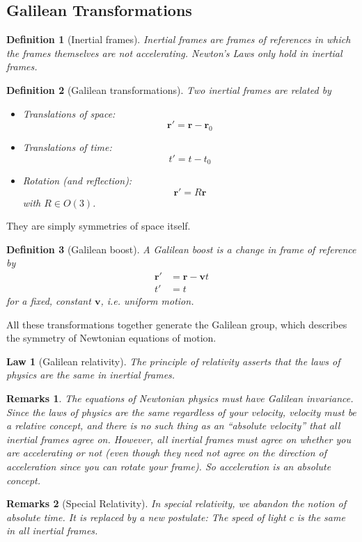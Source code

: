 \documentclass[a4paper]{article}
\newtheorem{remarks}{Remarks}[section]
\theoremstyle{new}
\newtheorem{law}{Law}[section]
\newtheorem{defi}{Definition}[section]
\begin{document}
\subsection{Galilean Transformations}
\begin{defi}[Inertial frames]
  Inertial frames are frames of references in which the frames themselves are not accelerating. Newton's Laws only hold in inertial frames.
\end{defi}
\begin{defi}[Galilean transformations]
  Two inertial frames are related by
  \begin{itemize}
  \item Translations of space:
    \[
      \mathbf{r}' = \mathbf{r} - \mathbf{r}_0
    \]
  \item Translations of time:
    \[
      t' = t - t_0
    \]
  \item Rotation (and reflection):
    \[
      \mathbf{r}' = R\mathbf{r}
    \]
    with $R\in O(3)$.
\end{itemize}
\end{defi}
They are simply symmetries of space itself.
\begin{defi}[Galilean boost]
  A Galilean boost is a change in frame of reference by
  \begin{align*}
    \mathbf{r}' &= \mathbf{r} - \mathbf{v}t\\
    t' &= t
  \end{align*}
  for a fixed, constant $\mathbf{v}$, i.e. uniform motion.
\end{defi}
All these transformations together generate the Galilean group, which describes the symmetry of Newtonian equations of motion.
\begin{law}[Galilean relativity]
  The principle of relativity asserts that the laws of physics are the same in inertial frames.
\end{law}
\begin{remarks}
The equations of Newtonian physics must have Galilean invariance. Since the laws of physics are the same regardless of your velocity, velocity must be a relative concept, and there is no such thing as an ``absolute velocity'' that all inertial frames agree on. However, all inertial frames must agree on whether you are accelerating or not (even though they need not agree on the direction of acceleration since you can rotate your frame). So acceleration is an absolute concept.
\end{remarks}
\begin{remarks}[Special Relativity]
In special relativity, we abandon the notion of absolute time. It is replaced by a new postulate: The speed of light $c$ is the same in all inertial frames.
\end{remarks}
\end{document}
